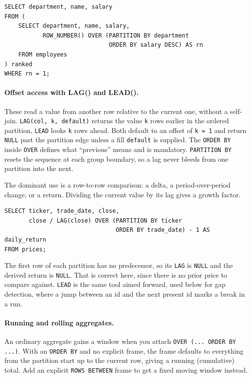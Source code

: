 \begin{lstlisting}[style=sql, caption={Highest-paid employee per department}]
SELECT department, name, salary
FROM (
    SELECT department, name, salary,
           ROW_NUMBER() OVER (PARTITION BY department
                              ORDER BY salary DESC) AS rn
    FROM employees
) ranked
WHERE rn = 1;
\end{lstlisting}

\paragraph{Offset access with LAG() and LEAD().} These read a value from
another row relative to the current one, without a self-join.
\texttt{LAG(col, k, default)} returns the value \texttt{k} rows earlier in the
ordered partition, \texttt{LEAD} looks \texttt{k} rows ahead. Both default to
an offset of \texttt{k = 1} and return \texttt{NULL} past the partition edge
unless a fill \texttt{default} is supplied. The \texttt{ORDER BY} inside
\texttt{OVER} defines what ``previous'' means and is mandatory.
\texttt{PARTITION BY} resets the sequence at each group boundary, so a lag
never bleeds from one partition into the next.

The dominant use is a row-to-row comparison: a delta, a period-over-period
change, or a return. Dividing the current value by its lag gives a growth
factor.

\begin{lstlisting}[style=sql, caption={Daily returns per ticker with LAG}]
SELECT ticker, trade_date, close,
       close / LAG(close) OVER (PARTITION BY ticker
                                ORDER BY trade_date) - 1 AS daily_return
FROM prices;
\end{lstlisting}

\vspace{-1.5ex}

The first row of each partition has no predecessor, so its \texttt{LAG} is
\texttt{NULL} and the derived return is \texttt{NULL}. That is correct here,
since there is no prior price to compare against. \texttt{LEAD} is the same
tool aimed forward, used below for gap detection, where a jump between an id
and the next present id marks a break in a run.

\paragraph{Running and rolling aggregates.} An ordinary aggregate gains a
window when you attach \texttt{OVER (... ORDER BY ...)}. With an
\texttt{ORDER BY} and no explicit frame, the frame defaults to everything from
the partition start up to the current row, giving a running (cumulative)
total. Add an explicit \texttt{ROWS BETWEEN} frame to get a fixed moving
window instead.

